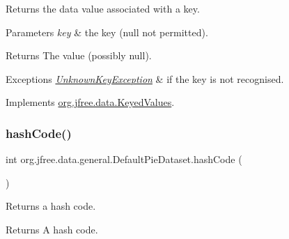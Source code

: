 Returns the data value associated with a key.


\begin{DoxyParams}{Parameters}
{\em key} & the key ({\ttfamily null} not permitted).\\
\hline
\end{DoxyParams}
\begin{DoxyReturn}{Returns}
The value (possibly {\ttfamily null}).
\end{DoxyReturn}

\begin{DoxyExceptions}{Exceptions}
{\em \mbox{\hyperlink{classorg_1_1jfree_1_1data_1_1_unknown_key_exception}{Unknown\+Key\+Exception}}} & if the key is not recognised. \\
\hline
\end{DoxyExceptions}


Implements \mbox{\hyperlink{interfaceorg_1_1jfree_1_1data_1_1_keyed_values_aa6bb7fe3ff33503d7f31b9be505c3a70}{org.\+jfree.\+data.\+Keyed\+Values}}.

\mbox{\label{classorg_1_1jfree_1_1data_1_1general_1_1_default_pie_dataset_a0d157479efb57a408a5793d5f453fb3e}} 
\subsubsection{\texorpdfstring{hash\+Code()}{hashCode()}}
{\footnotesize\ttfamily int org.\+jfree.\+data.\+general.\+Default\+Pie\+Dataset.\+hash\+Code (\begin{DoxyParamCaption}{ }\end{DoxyParamCaption})}

Returns a hash code.

\begin{DoxyReturn}{Returns}
A hash code. 
\end{DoxyReturn}
\mbox{\label{classorg_1_1jfree_1_1data_1_1general_1_1_default_pie_dataset_a1c7ce9c30fb2082770fae1ea60d31ba5}} 
